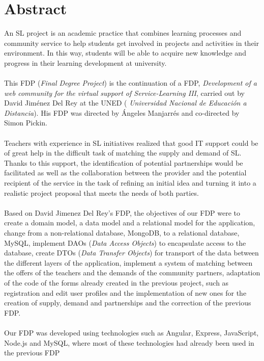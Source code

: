 \documentclass[11pt]{book}
\begin{document}
	\chapter*{Abstract} 
	An SL project is an academic practice that combines learning processes and community service to help students get involved in projects and activities in their environment. In this way, students will be able to acquire new knowledge and progress in their learning development at university. \\\\
	This FDP (\textit {Final Degree Project}) is the continuation of a FDP, \textit {Development of a web community for the virtual support of Service-Learning III}, carried out by David Jiménez Del Rey at the UNED (\emph { Universidad Nacional de Educación a Distancia}). His FDP was directed by Ángeles Manjarrés and co-directed by Simon Pickin. \\\\
	Teachers with experience in SL initiatives realized that good IT support could be of great help in the difficult task of matching the supply and demand of SL. Thanks to this support, the identification of potential partnerships would be facilitated as well as the collaboration between the provider and the potential recipient of the service in the task of refining an initial idea and turning it into a realistic project proposal that meets the needs of both parties. \\\\
	Based on David Jimenez Del Rey's FDP, the objectives of our FDP were to create a domain model, a data model and a relational model for the application, change from a non-relational database, MongoDB, to a relational database, MySQL, implement DAOs (\emph {Data Access Objects}) to encapsulate access to the database, create DTOs (\emph {Data Transfer Objects}) for transport of the data between the different layers of the application, implement a system of matching between the offers of the teachers and the demands of the community partners, adaptation of the code of the forms already created in the previous project, such as registration and edit user profiles and the implementation of new ones for the creation of supply, demand and partnerships and the correction of the previous FDP. \\\\
	Our FDP was developed using technologies such as Angular, Express, JavaScript, Node.js and MySQL, where most of these technologies had already been used in the previous FDP \\\\
	
\end{document}
